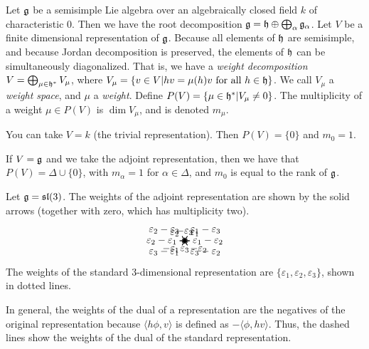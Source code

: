  \setcounter{lecture}{18}

 Let $\mathfrak{g}$ be a semisimple Lie algebra over an algebraically closed field $k$ of
 characteristic 0. Then we have the root decomposition $\mathfrak{g} = \mathfrak{h}\oplus \bigoplus_\alpha
 \mathfrak{g}_\alpha$. Let $V$ be a finite dimensional representation of $\mathfrak{g}$. Because all
 elements of $\mathfrak{h}$ are semisimple, and because Jordan decomposition is preserved, the
 elements of $\mathfrak{h}$ can be simultaneously diagonalized. That is, we have a \emph{weight
 decomposition} $V = \bigoplus_{\mu\in \mathfrak{h}^*} V_\mu$,
 where $V_\mu = \{v\in V| hv=\mu(h)v \text{ for all } h\in \mathfrak{h}\}$. We call $V_\mu$ a
 \emph{weight space}, and $\mu$ a
 \emph{weight}. Define $P(V) = \{\mu \in \mathfrak{h}^*| V_\mu\neq 0\}$. The
 multiplicity of a weight $\mu\in P(V)$ is $\dim V_\mu$, and is denoted $m_\mu$.
 \begin{example}
   You can take $V=k$ (the trivial representation). Then $P(V)=\{0\}$ and $m_0=1$.
 \end{example}
 \begin{example}
   If $V=\mathfrak{g}$ and we take the adjoint representation,
   then we have that $P(V)=\Delta\cup \{0\}$, with $m_\alpha=1$ for $\alpha\in
   \Delta$, and $m_0$ is equal to the rank of $\mathfrak{g}$.
 \end{example}
 \begin{example} Let $\mathfrak{g}=\mathfrak{sl}(3)$. The weights of the
 adjoint representation are shown by the solid arrows (together with zero, which has
 multiplicity two).
   \[\begin{xy}
   (0,0)="c",
   \ar@{.>} a(30)     ="1" *+!LD{\varepsilon_1},
   \ar@{.>} a(150)   ="2" *+!RD{\varepsilon_2},
   \ar@{.>} a(-90)  ="3" *+!U{\varepsilon_3},
   \ar@{-->} a(-150) *+!RU{-\varepsilon_1},
   \ar@{-->} a(-30)  *+!LU{-\varepsilon_2},
   \ar@{-->} a(90) *+!D{-\varepsilon_3},
   \ar@{->} "1"-"2" *+!L{\varepsilon_1 - \varepsilon_2},
   \ar@{->} "1"-"3" *+!DL{\varepsilon_1 - \varepsilon_3},
   \ar@{->} "2"-"1" *+!R{\varepsilon_2 - \varepsilon_1},
   \ar@{->} "2"-"3" *+!DR{\varepsilon_2 - \varepsilon_3},
   \ar@{->} "3"-"1" *+!UR{\varepsilon_3 - \varepsilon_1},
   \ar@{->} "3"-"2" *+!UL{\varepsilon_3 - \varepsilon_2},
  \end{xy}\]
   The weights of the standard 3-dimensional representation are
   $\{\varepsilon_1,\varepsilon_2,\varepsilon_3\}$, shown in dotted lines.

   In general, the weights of the dual of a representation are the negatives of the
   original representation because $\langle h\phi, v\rangle$ is defined as $-\langle
   \phi,hv\rangle$. Thus, the dashed lines show the weights of the dual of the
   standard representation.
 \end{example}
